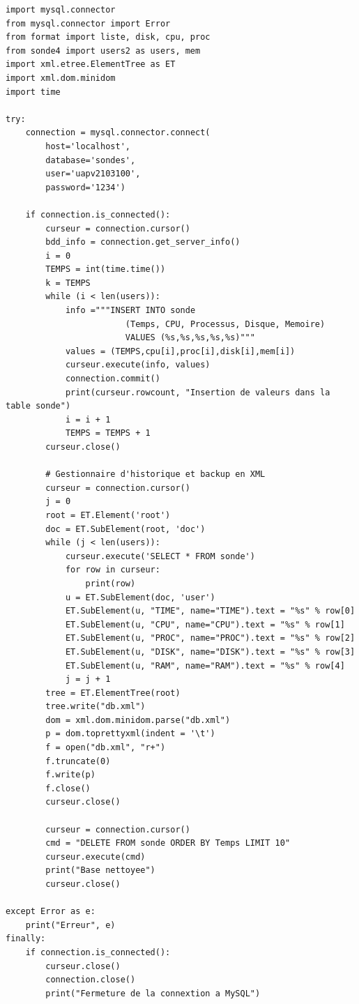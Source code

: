 \documentclass[a4paper, twoside]{report}
\begin{document}
\newpage
\begin{lstlisting}[style=python]
import mysql.connector
from mysql.connector import Error
from format import liste, disk, cpu, proc
from sonde4 import users2 as users, mem
import xml.etree.ElementTree as ET
import xml.dom.minidom
import time

try:
    connection = mysql.connector.connect(
        host='localhost',
        database='sondes',
        user='uapv2103100',
        password='1234')

    if connection.is_connected():
        curseur = connection.cursor()
        bdd_info = connection.get_server_info()
        i = 0
        TEMPS = int(time.time())
        k = TEMPS
        while (i < len(users)):
            info ="""INSERT INTO sonde
                        (Temps, CPU, Processus, Disque, Memoire)
                        VALUES (%s,%s,%s,%s,%s)"""
            values = (TEMPS,cpu[i],proc[i],disk[i],mem[i])
            curseur.execute(info, values)
            connection.commit()
            print(curseur.rowcount, "Insertion de valeurs dans la table sonde")
            i = i + 1
            TEMPS = TEMPS + 1
        curseur.close()

        # Gestionnaire d'historique et backup en XML
        curseur = connection.cursor()
        j = 0
        root = ET.Element('root')
        doc = ET.SubElement(root, 'doc')
        while (j < len(users)):
            curseur.execute('SELECT * FROM sonde')
            for row in curseur:
                print(row)
            u = ET.SubElement(doc, 'user')
            ET.SubElement(u, "TIME", name="TIME").text = "%s" % row[0]
            ET.SubElement(u, "CPU", name="CPU").text = "%s" % row[1]
            ET.SubElement(u, "PROC", name="PROC").text = "%s" % row[2]
            ET.SubElement(u, "DISK", name="DISK").text = "%s" % row[3]
            ET.SubElement(u, "RAM", name="RAM").text = "%s" % row[4]
            j = j + 1
        tree = ET.ElementTree(root)
        tree.write("db.xml")
        dom = xml.dom.minidom.parse("db.xml")
        p = dom.toprettyxml(indent = '\t')
        f = open("db.xml", "r+")
        f.truncate(0)
        f.write(p)
        f.close()
        curseur.close()

        curseur = connection.cursor()
        cmd = "DELETE FROM sonde ORDER BY Temps LIMIT 10"
        curseur.execute(cmd)
        print("Base nettoyee")
        curseur.close()

except Error as e:
    print("Erreur", e)
finally:
    if connection.is_connected():
        curseur.close()
        connection.close()
        print("Fermeture de la connextion a MySQL")

\end{lstlisting}
\end{document}

